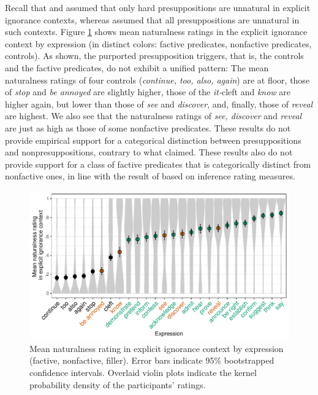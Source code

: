 \documentclass[11pt,fleqn]{article}
\newcommand{\6}{\mbox{$[\hspace*{-.6mm}[$}}
\newcommand{\9}{\mbox{$]\hspace*{-.6mm}]$}}
\begin{document}
Recall that \citealt{simons01} and \citealt{abusch10} assumed that only hard presuppositions are unnatural in explicit ignorance contexts, whereas \citealt{mandelkern-etal2020} assumed that all presuppositions are unnatural in such contexts. Figure \ref{fig:acc-by-expression} shows mean naturalness ratings in the explicit ignorance context by expression (in distinct colors: \color{orange}factive predicates\color{black}, \color{green}nonfactive predicates\color{black},  controls). As shown, the purported presupposition triggers, that is, the controls and the factive predicates, do not exhibit a unified pattern: The mean naturalness ratings of four controls ({\em continue, too, also, again}) are at floor, those of {\em stop} and {\em be annoyed} are slightly higher, those of the {\em it-}cleft and {\em know} are higher again, but lower than those of {\em see} and {\em discover}, and, finally, those of {\em reveal} are highest. We also see that the naturalness ratings of {\em see, discover} and {\em reveal} are just as high as those of some nonfactive predicates. These results do not provide empirical support for a categorical distinction between presuppositions and nonpresuppositions, contrary to what \citealt{mandelkern-etal2020} claimed. These results also do not provide support for a class of factive predicates that is categorically distinct from nonfactive ones, in line with the result of \citealt{degen-tonhauser-language} based on inference rating measures. 

\begin{figure}[h!]
\centering
\includegraphics[width=.9\textwidth]{../../results/main/13explicitIgnorance/graphs/explicit-ignorance-naturalness-by-predicate}
\caption{Mean naturalness rating in explicit ignorance context by expression (\color{orange}factive\color{black}, \color{green}nonfactive\color{green}, \color{black}filler\color{black}). Error bars indicate 95\% bootstrapped confidence intervals. Overlaid violin plots indicate the kernel probability density of the participants' ratings.}\label{fig:acc-by-expression}
\end{figure}
\end{document}
